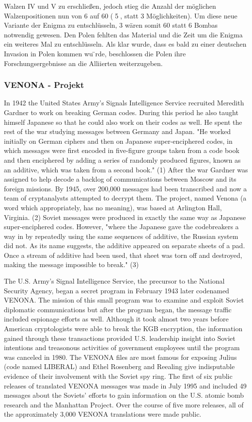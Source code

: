 Walzen IV und V zu erschließen, jedoch stieg die Anzahl der möglichen Walzenpositionen
nun von 6 auf 60 (􏰀5􏰁, statt 3 Möglichkeiten). Um diese neue Variante der Enigma zu entschlüsseln, 3
wären somit 60 statt 6 Bombas notwendig gewesen. Den Polen fehlten das Material und die Zeit um die Enigma ein weiteres Mal zu entschlüsseln. Als klar wurde, dass es bald zu einer deutschen Invasion in Polen kommen wu ̈rde, beschlossen die Polen ihre Forschungsergebnisse an die Alliierten weiterzugeben.


\subsubsection{VENONA - Projekt}

\cite{simkin_2020}
In 1942 the United States Army's Signals Intelligence Service recruited Meredith Gardner to work on breaking German codes. During this period he also taught himself Japanese so that he could also work on their codes as well. He spent the rest of the war studying messages between Germany and Japan. "He worked initially on German ciphers and then on Japanese super-enciphered codes, in which messages were first encoded in five-figure groups taken from a code book and then enciphered by adding a series of randomly produced figures, known as an additive, which was taken from a second book." (1)
After the war Gardner was assigned to help decode a backlog of communications between Moscow and its foreign missions. By 1945, over 200,000 messages had been transcribed and now a team of cryptanalysts attempted to decrypt them. The project, named Venona (a word which appropriately, has no meaning), was based at Arlington Hall, Virginia. (2) Soviet messages were produced in exactly the same way as Japanese super-enciphered codes. However, "where the Japanese gave the codebreakers a way in by repeatedly using the same sequences of additive, the Russian system did not. As its name suggests, the additive appeared on separate sheets of a pad. Once a stream of additive had been used, that sheet was torn off and destroyed, making the message impossible to break." (3)

\cite{venona_NSA}
The U.S. Army's Signal Intelligence Service, the precursor to the National Security Agency, began a secret program in February 1943 later codenamed VENONA.
The mission of this small program was to examine and exploit Soviet diplomatic communications but after the program began, the message traffic included espionage efforts as well.
Although it took almost two years before American cryptologists were able to break the KGB encryption, the information gained through these transactions provided U.S. leadership insight into Soviet intentions and treasonous activities of government employees until the program was canceled in 1980.
The VENONA files are most famous for exposing Julius (code named LIBERAL) and Ethel Rosenberg and Reealing give indisputable evidence of their involvement with the Soviet spy ring.
The first of six public releases of translated VENONA messages was made in July 1995 and included 49 messages about the Soviets' efforts to gain information on the U.S. atomic bomb research and the Manhattan Project. Over the course of five more releases, all of the approximately 3,000 VENONA translations were made public.


